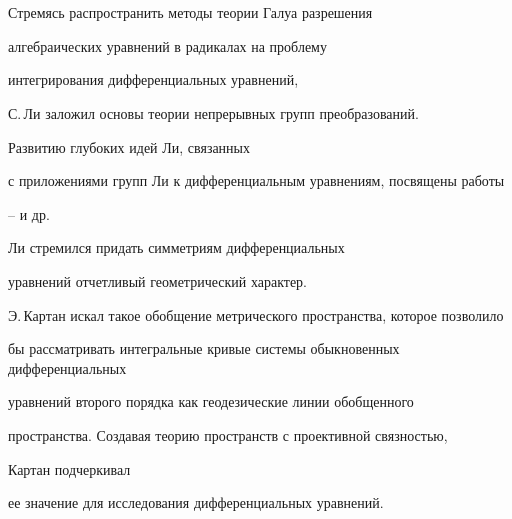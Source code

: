 \date{}




\pagestyle{plain} %







\maketitle


\label{begin}








\section{}\label{par0}





Стремясь распространить методы теории Галуа разрешения


алгебраических уравнений в радикалах на проблему


интегрирования дифференциальных уравнений,


С.\,Ли заложил основы теории непрерывных групп преобразований.


Развитию глубоких идей Ли, связанных


с приложениями групп Ли к дифференциальным уравнениям, посвящены работы


\cite{Birkhoff_54}--\cite{Olver_89} и др.





Ли стремился придать симметриям дифференциальных


уравнений отчетливый геометрический характер.


Э.\,Картан искал такое обобщение метрического пространства, которое позволило


бы рассматривать интегральные кривые системы обыкновенных дифференциальных


уравнений второго порядка как геодезические линии обобщенного


пространства. Создавая теорию пространств с проективной связностью,


Картан подчеркивал


ее значение для исследования дифференциальных уравнений.


